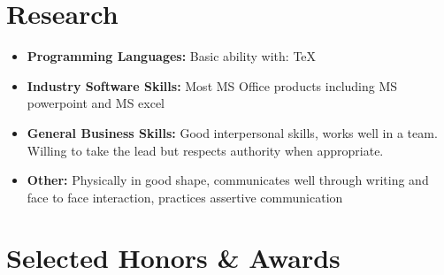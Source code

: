 \documentclass[11pt,a4paper,sans]{moderncv}        %
\begin{document}

\section{Research}

\vspace{4pt}

\begin{itemize}
	
	\item \textbf{Programming Languages:} Basic ability with: TeX
	
	\vspace{4pt}
	
	\item \textbf{Industry Software Skills:} Most MS Office products including MS powerpoint and MS excel
	
	\vspace{4pt}
	
	\item \textbf{General Business Skills:} Good interpersonal skills, works well in a team. Willing to take the lead but respects authority when appropriate.
	
	\vspace{4pt}
	
	\item \textbf{Other:} Physically in good shape, communicates well through writing and face to face interaction, practices assertive communication
	
\end{itemize}


%
%
%

\section{Selected Honors \& Awards}

\vspace{4pt}
\end{document}
